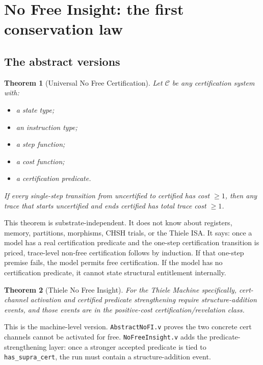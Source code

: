 \documentclass[11pt,a4paper]{article}
\theoremstyle{plain}
\newtheorem{theorem}{Theorem}[section]
\theoremstyle{definition}
\theoremstyle{remark}
\begin{document}
\section{No Free Insight: the first conservation law}
\label{sec:nofi}

\subsection{The abstract versions}

\begin{theorem}[Universal No Free Certification]
\label{thm:nofi}
Let $\mathcal{C}$ be any certification system with:
\begin{itemize}
\item a state type;
\item an instruction type;
\item a step function;
\item a cost function;
\item a certification predicate.
\end{itemize}
If every single-step transition from uncertified to certified has cost $\geq 1$, then any trace that starts uncertified and ends certified has total trace cost $\geq 1$.
\end{theorem}

This theorem is substrate-independent. It does not know about registers, memory, partitions, morphisms, CHSH trials, or the Thiele ISA. It says: once a model has a real certification predicate and the one-step certification transition is priced, trace-level non-free certification follows by induction. If that one-step premise fails, the model permits free certification. If the model has no certification predicate, it cannot state structural entitlement internally.

\begin{theorem}[Thiele No Free Insight]
For the Thiele Machine specifically, cert-channel activation and certified predicate strengthening require structure-addition events, and those events are in the positive-cost certification/revelation class.
\end{theorem}

This is the machine-level version. \texttt{AbstractNoFI.v} proves the two concrete cert channels cannot be activated for free. \texttt{NoFreeInsight.v} adds the predicate-strengthening layer: once a stronger accepted predicate is tied to \texttt{has\_supra\_cert}, the run must contain a structure-addition event.
\end{document}
